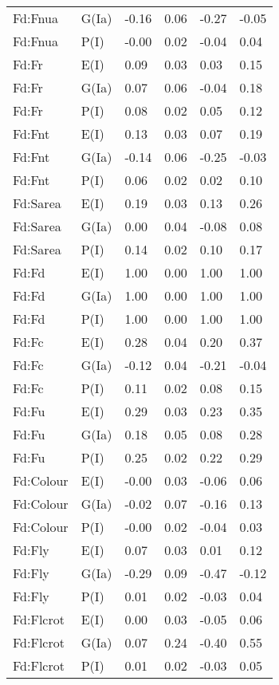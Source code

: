 \begin{center}
\begin{longtable}{|p{1.1in}|p{0.7in}|p{0.7in}|p{0.6in}|p{0.6in}|p{0.6in}|}
  Fd:Fnua & G(Ia) & -0.16 & 0.06 & -0.27 & -0.05 \\ 
  Fd:Fnua & P(I) & -0.00 & 0.02 & -0.04 & 0.04 \\ 
  Fd:Fr & E(I) & 0.09 & 0.03 & 0.03 & 0.15 \\ 
  Fd:Fr & G(Ia) & 0.07 & 0.06 & -0.04 & 0.18 \\ 
  Fd:Fr & P(I) & 0.08 & 0.02 & 0.05 & 0.12 \\ 
  Fd:Fnt & E(I) & 0.13 & 0.03 & 0.07 & 0.19 \\ 
  Fd:Fnt & G(Ia) & -0.14 & 0.06 & -0.25 & -0.03 \\ 
  Fd:Fnt & P(I) & 0.06 & 0.02 & 0.02 & 0.10 \\ 
  Fd:Sarea & E(I) & 0.19 & 0.03 & 0.13 & 0.26 \\ 
  Fd:Sarea & G(Ia) & 0.00 & 0.04 & -0.08 & 0.08 \\ 
  Fd:Sarea & P(I) & 0.14 & 0.02 & 0.10 & 0.17 \\ 
  Fd:Fd & E(I) & 1.00 & 0.00 & 1.00 & 1.00 \\ 
  Fd:Fd & G(Ia) & 1.00 & 0.00 & 1.00 & 1.00 \\ 
  Fd:Fd & P(I) & 1.00 & 0.00 & 1.00 & 1.00 \\ 
  Fd:Fc & E(I) & 0.28 & 0.04 & 0.20 & 0.37 \\ 
  Fd:Fc & G(Ia) & -0.12 & 0.04 & -0.21 & -0.04 \\ 
  Fd:Fc & P(I) & 0.11 & 0.02 & 0.08 & 0.15 \\ 
  Fd:Fu & E(I) & 0.29 & 0.03 & 0.23 & 0.35 \\ 
  Fd:Fu & G(Ia) & 0.18 & 0.05 & 0.08 & 0.28 \\ 
  Fd:Fu & P(I) & 0.25 & 0.02 & 0.22 & 0.29 \\ 
  Fd:Colour & E(I) & -0.00 & 0.03 & -0.06 & 0.06 \\ 
  Fd:Colour & G(Ia) & -0.02 & 0.07 & -0.16 & 0.13 \\ 
  Fd:Colour & P(I) & -0.00 & 0.02 & -0.04 & 0.03 \\ 
  Fd:Fly & E(I) & 0.07 & 0.03 & 0.01 & 0.12 \\ 
  Fd:Fly & G(Ia) & -0.29 & 0.09 & -0.47 & -0.12 \\ 
  Fd:Fly & P(I) & 0.01 & 0.02 & -0.03 & 0.04 \\ 
  Fd:Flcrot & E(I) & 0.00 & 0.03 & -0.05 & 0.06 \\ 
  Fd:Flcrot & G(Ia) & 0.07 & 0.24 & -0.40 & 0.55 \\ 
  Fd:Flcrot & P(I) & 0.01 & 0.02 & -0.03 & 0.05 \\ 

\end{longtable}
\end{center}
